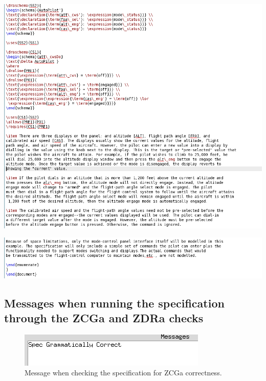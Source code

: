 \noindent \includegraphics[scale=0.5]{examples/semiform/1n2b.png}

\noindent \includegraphics[scale=0.5]{examples/semiform/1n2c.png}






\subsection{Messages when running the specification through the ZCGa and ZDRa checks}

\begin{figure}[H]
\includegraphics[scale=0.7]{examples/semiform/zcgacorrect.png}
\caption{Message when checking the specification for ZCGa correctness.}
\end{figure}

